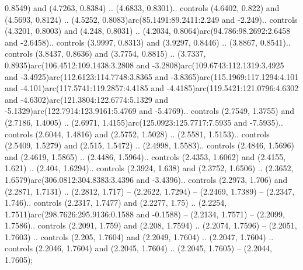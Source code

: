 0.8549) and (4.7263, 0.8384) .. (4.6833, 0.8301).. controls (4.6402, 0.822) and (4.5693, 0.8124) .. (4.5252, 0.8083)arc(85.1491:89.2411:2.249 and -2.249).. controls (4.3201, 0.8003) and (4.248, 0.8031) .. (4.2034, 0.8064)arc(94.786:98.2692:2.6458 and -2.6458).. controls (3.9997, 0.8313) and (3.9297, 0.8446) .. (3.8867, 0.8541).. controls (3.8437, 0.8636) and (3.7754, 0.8815) .. (3.7337, 0.8935)arc(106.4512:109.1438:3.2808 and -3.2808)arc(109.6743:112.1319:3.4925 and -3.4925)arc(112.6123:114.7748:3.8365 and -3.8365)arc(115.1969:117.1294:4.101 and -4.101)arc(117.5741:119.2857:4.4185 and -4.4185)arc(119.5421:121.0796:4.6302 and -4.6302)arc(121.3804:122.6774:5.1329 and -5.1329)arc(122.7914:123.9161:5.4769 and -5.4769).. controls (2.7549, 1.3755) and (2.7186, 1.4005) .. (2.6971, 1.4155)arc(125.0923:125.7717:7.5935 and -7.5935).. controls (2.6044, 1.4816) and (2.5752, 1.5028) .. (2.5581, 1.5153).. controls (2.5409, 1.5279) and (2.515, 1.5472) .. (2.4998, 1.5583).. controls (2.4846, 1.5696) and (2.4619, 1.5865) .. (2.4486, 1.5964).. controls (2.4353, 1.6062) and (2.4155, 1.621) .. (2.404, 1.6294).. controls (2.3924, 1.638) and (2.3752, 1.6506) .. (2.3652, 1.6579)arc(306.0812:304.8383:3.4396 and -3.4396).. controls (2.2973, 1.706) and (2.2871, 1.7131) .. (2.2812, 1.717) -- (2.2622, 1.7294) -- (2.2469, 1.7389) -- (2.2347, 1.746).. controls (2.2317, 1.7477) and (2.2277, 1.75) .. (2.2254, 1.7511)arc(298.7626:295.9136:0.1588 and -0.1588) -- (2.2134, 1.7571) -- (2.2099, 1.7586).. controls (2.2091, 1.759) and (2.208, 1.7594) .. (2.2074, 1.7596) -- (2.2051, 1.7603) .. controls (2.205, 1.7604) and (2.2049, 1.7604) .. (2.2047, 1.7604) .. controls (2.2046, 1.7604) and (2.2045, 1.7604) .. (2.2045, 1.7605) -- (2.2044, 1.7605);



